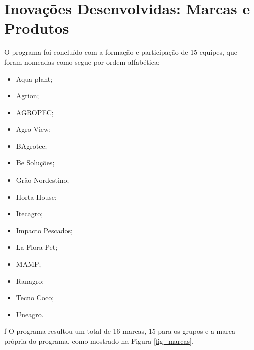 \section{Inovações Desenvolvidas: Marcas e Produtos}
\label{inovacoes}

O programa foi concluído  com a formação e participação de 15 equipes, que foram nomeadas como segue por ordem alfabética: 

\begin{multicols}{3}
\centering
    \begin{itemize}
\item { Aqua plant;}
\item { Agrion;}
\item { AGROPEC;}
\item { Agro View;}
\item { BAgrotec;}
\item { Be Soluções;}
\item { Grão Nordestino;}
\item { Horta House;}
\item { Itecagro;}
\item { Impacto Pescados;}
\item { La Flora Pet;}
\item { MAMP;}
\item { Ranagro;}
\item { Tecno Coco;}
\item { Uneagro.}
\end{itemize}
\end{multicols}

f
O programa resultou um total de 16 marcas, 15 para os grupos e a marca própria do programa, como mostrado na Figura \ref{fig_marcas}.

